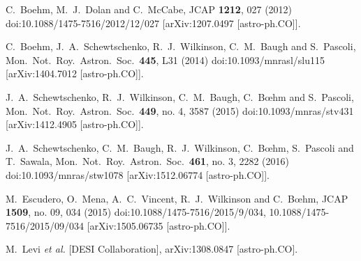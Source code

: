\documentclass[aps,prd,a4paper,twocolumn,amsmath,showpacs,superscriptaddress,nofootinbib,preprintnumbers]{revtex4-1}
\begin{document}
\begin{thebibliography}{99}
  C.~Boehm, M.~J.~Dolan and C.~McCabe,
  JCAP {\bf 1212}, 027 (2012)
  doi:10.1088/1475-7516/2012/12/027
  [arXiv:1207.0497 [astro-ph.CO]].
  
  
  C.~Boehm, J.~A.~Schewtschenko, R.~J.~Wilkinson, C.~M.~Baugh and S.~Pascoli,
  Mon.\ Not.\ Roy.\ Astron.\ Soc.\  {\bf 445}, L31 (2014)
  doi:10.1093/mnrasl/slu115
  [arXiv:1404.7012 [astro-ph.CO]].
  
  
  J.~A.~Schewtschenko, R.~J.~Wilkinson, C.~M.~Baugh, C.~Bœhm and S.~Pascoli,
  Mon.\ Not.\ Roy.\ Astron.\ Soc.\  {\bf 449}, no. 4, 3587 (2015)
  doi:10.1093/mnras/stv431
  [arXiv:1412.4905 [astro-ph.CO]].
  
  
  
  J.~A.~Schewtschenko, C.~M.~Baugh, R.~J.~Wilkinson, C.~Bœhm, S.~Pascoli and T.~Sawala,
  Mon.\ Not.\ Roy.\ Astron.\ Soc.\  {\bf 461}, no. 3, 2282 (2016)
  doi:10.1093/mnras/stw1078
  [arXiv:1512.06774 [astro-ph.CO]].
  
  
  
  M.~Escudero, O.~Mena, A.~C.~Vincent, R.~J.~Wilkinson and C.~Bœhm,
  JCAP {\bf 1509}, no. 09, 034 (2015)
  doi:10.1088/1475-7516/2015/9/034, 10.1088/1475-7516/2015/09/034
  [arXiv:1505.06735 [astro-ph.CO]].
  
  
  
  M.~Levi {\it et al.} [DESI Collaboration],
  arXiv:1308.0847 [astro-ph.CO].
  
  
  
  
  
\end{thebibliography}
\end{document}
